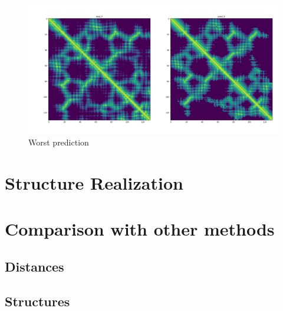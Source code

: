 \begin{figure}
    \centering
    \includegraphics[width=\linewidth]{imgs_andy/3kitJ00_worst_prediction.png}
    \caption{Worst prediction}
    \label{fig:worst}
\end{figure}

\section{Structure Realization}

\section{Comparison with other methods}
\subsection{Distances}
\subsection{Structures}
